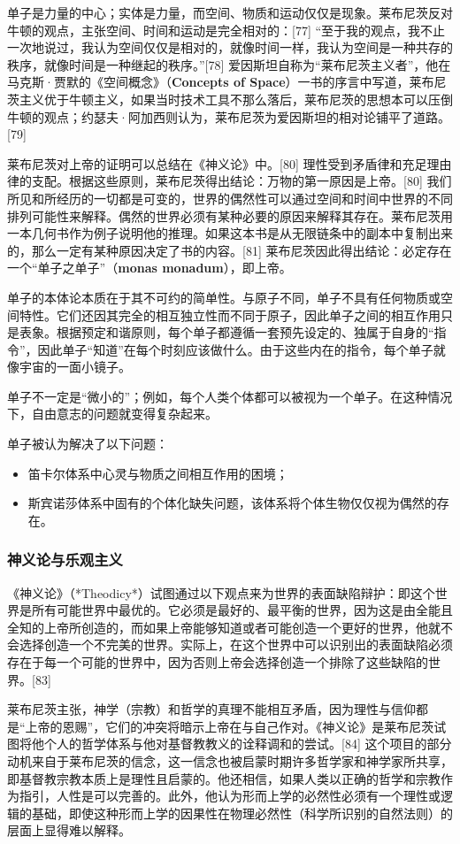 单子是力量的中心；实体是力量，而空间、物质和运动仅仅是现象。莱布尼茨反对牛顿的观点，主张空间、时间和运动是完全相对的：[77] “至于我的观点，我不止一次地说过，我认为空间仅仅是相对的，就像时间一样，我认为空间是一种共存的秩序，就像时间是一种继起的秩序。”[78] 爱因斯坦自称为“莱布尼茨主义者”，他在马克斯·贾默的《空间概念》（\textbf{Concepts of Space}）一书的序言中写道，莱布尼茨主义优于牛顿主义，如果当时技术工具不那么落后，莱布尼茨的思想本可以压倒牛顿的观点；约瑟夫·阿加西则认为，莱布尼茨为爱因斯坦的相对论铺平了道路。[79]

莱布尼茨对上帝的证明可以总结在《神义论》中。[80] 理性受到矛盾律和充足理由律的支配。根据这些原则，莱布尼茨得出结论：万物的第一原因是上帝。[80] 我们所见和所经历的一切都是可变的，世界的偶然性可以通过空间和时间中世界的不同排列可能性来解释。偶然的世界必须有某种必要的原因来解释其存在。莱布尼茨用一本几何书作为例子说明他的推理。如果这本书是从无限链条中的副本中复制出来的，那么一定有某种原因决定了书的内容。[81] 莱布尼茨因此得出结论：必定存在一个“单子之单子”（\textbf{monas monadum}），即上帝。

单子的本体论本质在于其不可约的简单性。与原子不同，单子不具有任何物质或空间特性。它们还因其完全的相互独立性而不同于原子，因此单子之间的相互作用只是表象。根据预定和谐原则，每个单子都遵循一套预先设定的、独属于自身的“指令”，因此单子“知道”在每个时刻应该做什么。由于这些内在的指令，每个单子就像宇宙的一面小镜子。

单子不一定是“微小的”；例如，每个人类个体都可以被视为一个单子。在这种情况下，自由意志的问题就变得复杂起来。

单子被认为解决了以下问题：  
\begin{itemize}
\item 笛卡尔体系中心灵与物质之间相互作用的困境；  
\item 斯宾诺莎体系中固有的个体化缺失问题，该体系将个体生物仅仅视为偶然的存在。
\end{itemize}
\subsubsection{神义论与乐观主义} 
《神义论》（*Theodicy*）试图通过以下观点来为世界的表面缺陷辩护：即这个世界是所有可能世界中最优的。它必须是最好的、最平衡的世界，因为这是由全能且全知的上帝所创造的，而如果上帝能够知道或者可能创造一个更好的世界，他就不会选择创造一个不完美的世界。实际上，在这个世界中可以识别出的表面缺陷必须存在于每一个可能的世界中，因为否则上帝会选择创造一个排除了这些缺陷的世界。[83]  

莱布尼茨主张，神学（宗教）和哲学的真理不能相互矛盾，因为理性与信仰都是“上帝的恩赐”，它们的冲突将暗示上帝在与自己作对。《神义论》是莱布尼茨试图将他个人的哲学体系与他对基督教教义的诠释调和的尝试。[84] 这个项目的部分动机来自于莱布尼茨的信念，这一信念也被启蒙时期许多哲学家和神学家所共享，即基督教宗教本质上是理性且启蒙的。他还相信，如果人类以正确的哲学和宗教作为指引，人性是可以完善的。此外，他认为形而上学的必然性必须有一个理性或逻辑的基础，即使这种形而上学的因果性在物理必然性（科学所识别的自然法则）的层面上显得难以解释。

